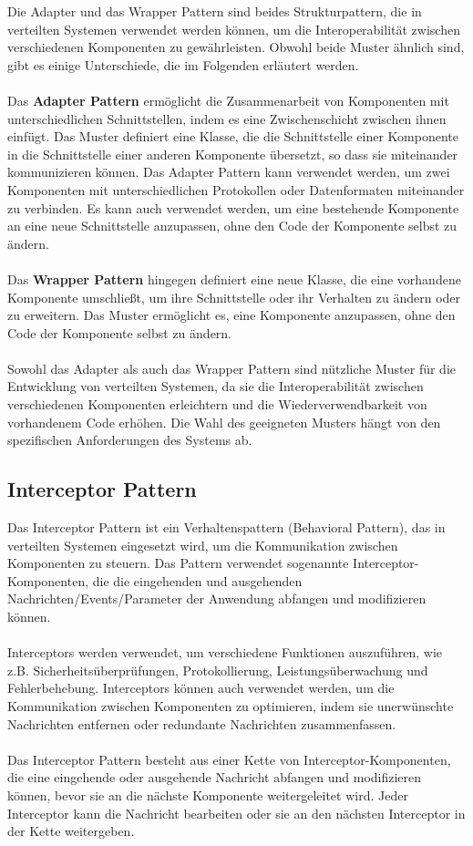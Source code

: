 \documentclass[../vs-script-first-v01.tex]{subfiles}
\begin{document}
Die Adapter und das Wrapper Pattern sind beides Strukturpattern, die in verteilten Systemen verwendet werden können, um die Interoperabilität zwischen verschiedenen Komponenten zu gewährleisten. Obwohl beide Muster ähnlich sind, gibt es einige Unterschiede, die im Folgenden erläutert werden.
\\\\
Das \textbf{Adapter Pattern} ermöglicht die Zusammenarbeit von Komponenten mit unterschiedlichen Schnittstellen, indem es eine Zwischenschicht zwischen ihnen einfügt. Das Muster definiert eine Klasse, die die Schnittstelle einer Komponente in die Schnittstelle einer anderen Komponente übersetzt, so dass sie miteinander kommunizieren können. Das Adapter Pattern kann verwendet werden, um zwei Komponenten mit unterschiedlichen Protokollen oder Datenformaten miteinander zu verbinden. Es kann auch verwendet werden, um eine bestehende Komponente an eine neue Schnittstelle anzupassen, ohne den Code der Komponente selbst zu ändern.
\\\\
Das \textbf{Wrapper Pattern} hingegen definiert eine neue Klasse, die eine vorhandene Komponente umschließt, um ihre Schnittstelle oder ihr Verhalten zu ändern oder zu erweitern. Das Muster ermöglicht es, eine Komponente anzupassen, ohne den Code der Komponente selbst zu ändern. 
\\\\
Sowohl das Adapter als auch das Wrapper Pattern sind nützliche Muster für die Entwicklung von verteilten Systemen, da sie die Interoperabilität zwischen verschiedenen Komponenten erleichtern und die Wiederverwendbarkeit von vorhandenem Code erhöhen. Die Wahl des geeigneten Musters hängt von den spezifischen Anforderungen des Systems ab.


\subsection{Interceptor Pattern}
Das Interceptor Pattern ist ein Verhaltenspattern (Behavioral Pattern), das in verteilten Systemen eingesetzt wird, um die Kommunikation zwischen Komponenten zu steuern. Das Pattern verwendet sogenannte Interceptor- Komponenten, die die eingehenden und ausgehenden Nachrichten/Events/Parameter der Anwendung abfangen und modifizieren können.
\\\\
Interceptors werden verwendet, um verschiedene Funktionen auszuführen, wie z.B. Sicherheitsüberprüfungen, Protokollierung, Leistungsüberwachung und Fehlerbehebung. Interceptors können auch verwendet werden, um die Kommunikation zwischen Komponenten zu optimieren, indem sie unerwünschte Nachrichten entfernen oder redundante Nachrichten zusammenfassen.
\\\\
Das Interceptor Pattern besteht aus einer Kette von Interceptor-Komponenten, die eine eingehende oder ausgehende Nachricht abfangen und modifizieren können, bevor sie an die nächste Komponente weitergeleitet wird. Jeder Interceptor kann die Nachricht bearbeiten oder sie an den nächsten Interceptor in der Kette weitergeben.
\end{document}
